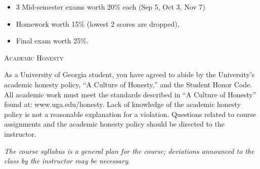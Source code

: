 \documentclass[12pt]{amsart}
\begin{document}
\begin{itemize}
\item
3 Mid-semester exams worth 20\% each (Sep 5, Oct 3, Nov 7)
\item
Homework worth 15\% (lowest 2
scores are dropped), 
\item
Final exam worth 25\%.
\end{itemize}

\medskip

\noindent
\textsc{Academic Honesty}

As a University of Georgia student, you have agreed to abide by the
University’s academic 
honesty policy, “A Culture of Honesty,” and the Student Honor Code.  All
academic work 
must meet the standards described in “A Culture of Honesty” found at: 
www.uga.edu/honesty.  Lack of knowledge of the academic honesty policy is
not a 
reasonable explanation for a violation.  Questions related to course
assignments and the 
academic honesty policy should be directed to the instructor.



\smallskip

\textit{The course syllabus is a general plan for the course; deviations
announced to the class by 
the instructor may be necessary.}
\end{document}
